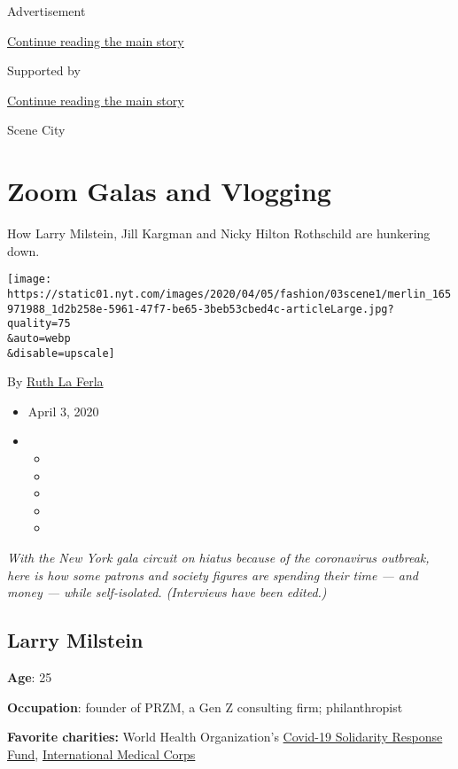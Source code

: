 Advertisement

\protect\hyperlink{after-top}{Continue reading the main story}

Supported by

\protect\hyperlink{after-sponsor}{Continue reading the main story}

Scene City

\hypertarget{zoom-galas-and-vlogging}{%
\section{Zoom Galas and Vlogging}\label{zoom-galas-and-vlogging}}

How Larry Milstein, Jill Kargman and Nicky Hilton Rothschild are
hunkering down.

\texttt{[image: https://static01.nyt.com/images/2020/04/05/fashion/03scene1/merlin\_165971988\_1d2b258e-5961-47f7-be65-3beb53cbed4c-articleLarge.jpg?quality=75\\\&auto=webp\\\&disable=upscale]}

By \href{https://www.nytimes.com/by/ruth-la-ferla}{Ruth La Ferla}

\begin{itemize}
\item
  April 3, 2020
\item
  \begin{itemize}
  \item
  \item
  \item
  \item
  \item
  \end{itemize}
\end{itemize}

\emph{With the New York gala circuit on hiatus because of the
coronavirus outbreak, here is how some patrons and society figures are
spending their time --- and money --- while self-isolated. (Interviews
have been edited.)}

\hypertarget{larry-milstein}{%
\subsection{Larry Milstein}\label{larry-milstein}}

\textbf{Age}: 25

\textbf{Occupation}: founder of PRZM, a Gen Z consulting firm;
philanthropist

\textbf{Favorite charities:} World Health Organization's
\href{https://www.who.int/emergencies/diseases/novel-coronavirus-2019/donate}{Covid-19
Solidarity Response Fund},
\href{https://internationalmedicalcorps.org/}{International Medical
Corps}

